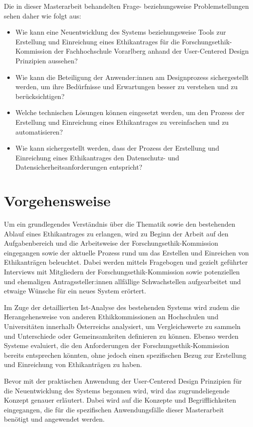 Die in dieser Masterarbeit behandelten Frage- beziehungsweise Problemstellungen sehen daher wie folgt aus:
\begin{itemize}
    \item Wie kann eine Neuentwicklung des Systems beziehungsweise Tools zur Erstellung und Einreichung eines Ethikantrages für die Forschungsethik-Kommission der Fachhochschule Vorarlberg anhand der User-Centered Design Prinzipien aussehen?
    \item Wie kann die Beteiligung der Anwender:innen am Designprozess sichergestellt werden, um ihre Bedürfnisse und Erwartungen besser zu verstehen und zu berücksichtigen?
    \item Welche technischen Lösungen können eingesetzt werden, um den Prozess der Erstellung und Einreichung eines Ethikantrages zu vereinfachen und zu automatisieren?
    \item Wie kann sichergestellt werden, dass der Prozess der Erstellung und Einreichung eines Ethikantrages den Datenschutz- und Datensicherheitsanforderungen entspricht?
\end{itemize}

\section{Vorgehensweise}
\label{sec:vorgehensweise}

Um ein grundlegendes Verständnis über die Thematik sowie den bestehenden Ablauf eines Ethikantrages zu erlangen, wird zu Beginn der Arbeit auf den Aufgabenbereich und die Arbeitsweise der Forschungsethik-Kommission eingegangen sowie der aktuelle Prozess rund um das Erstellen und Einreichen von Ethikanträgen beleuchtet. Dabei werden mittels Fragebogen und gezielt geführter Interviews mit Mitgliedern der Forschungsethik-Kommission sowie potenziellen und ehemaligen Antragssteller:innen allfällige Schwachstellen aufgearbeitet und etwaige Wünsche für ein neues System erörtert.

Im Zuge der detaillierten Ist-Analyse des bestehenden Systems wird zudem die Herangehensweise von anderen Ethikkommissionen an Hochschulen und Universitäten innerhalb Österreichs analysiert, um Vergleichswerte zu sammeln und Unterschiede oder Gemeinsamkeiten definieren zu können. Ebenso werden Systeme evaluiert, die den Anforderungen der Forschungsethik-Kommission bereits entsprechen könnten, ohne jedoch einen spezifischen Bezug zur Erstellung und Einreichung von Ethikanträgen zu haben.

Bevor mit der praktischen Anwendung der User-Centered Design Prinzipien für die Neuentwicklung des Systems begonnen wird, wird das zugrundeliegende Konzept genauer erläutert. Dabei wird auf die Konzepte und Begrifflichkeiten eingegangen, die für die spezifischen Anwendungsfälle dieser Masterarbeit benötigt und angewendet werden.

